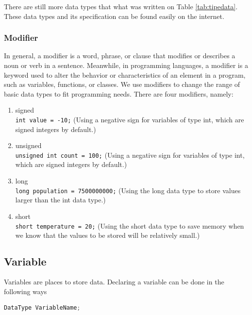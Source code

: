There are still more data types that what was written on Table \ref{tab:tipedata}. These data types and its specification can be found easily on the internet.

\subsubsection{Modifier}
In general, a modifier is a word, phrase, or clause that modifies or describes a noun or verb in a sentence. Meanwhile, in programming languages, a modifier is a keyword used to alter the behavior or characteristics of an element in a program, such as variables, functions, or classes. We use modifiers to change the range of basic data types to fit programming needs. There are four modifiers, namely:
\begin{enumerate}
	\item signed \\
	\verb|int value = -10;| (Using a negative sign for variables of type int, which are signed integers by default.)
	\item unsigned \\
	\verb|unsigned int count = 100;|  (Using a negative sign for variables of type int, which are signed integers by default.)
	\item long \\ 
	\verb|long population = 7500000000;| (Using the long data type to store values larger than the int data type.)
	\item short \\
	\verb|short temperature = 20;| (Using the short data type to save memory when we know that the values to be stored will be relatively small.)
\end{enumerate}


\subsection{Variable}
Variables are places to store data. Declaring a variable can be done in the following ways
\begin{lstlisting}[language=c,caption=C variable declaration,label=lst:deklarasivariabel,captionpos=t]
DataType VariableName;
\end{lstlisting}
